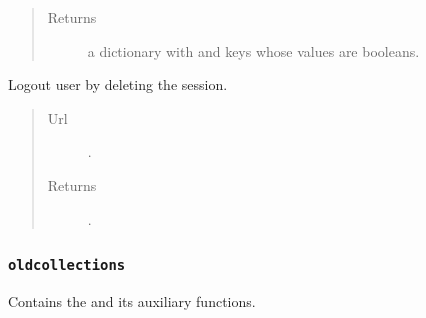 \documentclass[letterpaper,10pt,english]{sphinxmanual}
\begin{document}
\begin{fulllineitems}
\begin{fulllineitems}
\begin{quote}
\begin{description}
\item[{Returns}] \leavevmode
a dictionary with  and 
keys whose values are booleans.

\end{description}\end{quote}

\end{fulllineitems}


\begin{fulllineitems}
\label{api:onlinelinguisticdatabase.controllers.login.LoginController.logout}
Logout user by deleting the session.
\begin{quote}\begin{description}
\item[{Url }] \leavevmode
{}.

\item[{Returns}] \leavevmode
{}.

\end{description}\end{quote}

\end{fulllineitems}


\end{fulllineitems}



\subsubsection{\texttt{oldcollections}}
\label{api:module-onlinelinguisticdatabase.controllers.oldcollections}\label{api:oldcollections}
Contains the {\hyperref[api:onlinelinguisticdatabase.controllers.oldcollections.OldcollectionsController]{}} and its auxiliary functions.
\label{api:module-collections}
\end{document}
